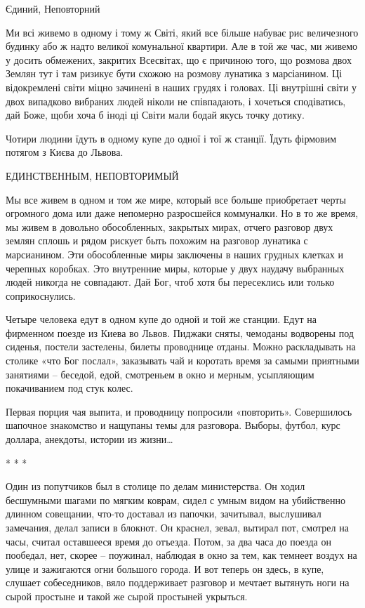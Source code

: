  
 
 
 
 

Єдиний, Неповторний

Ми всі живемо в одному і тому ж Світі, який все більше набуває рис величезного
будинку або ж надто великої комунальної квартири.  Але в той же час, ми живемо
у досить обмежених, закритих Всесвітах, що є причиною того, що розмова двох
Землян тут і там ризикує бути схожою на розмову лунатика з марсіанином. Ці
відокремлені світи міцно зачинені в наших грудях і головах. Ці внутрішні світи
у двох випадково вибраних людей ніколи не співпадають, і хочеться сподіватись,
дай Боже, щоби хоча б іноді ці Світи мали бодай якусь точку дотику.

Чотири людини їдуть в одному купе до одної і тої ж станції. Їдуть фірмовим потягом з Києва до Львова. 

ЕДИНСТВЕННЫМ, НЕПОВТОРИМЫЙ

Мы все живем в одном и том же мире, который все больше приобретает черты огромного дома или даже непомерно разросшейся коммуналки. Но в то же время, мы живем в довольно обособленных, закрытых мирах, отчего разговор двух землян сплошь и рядом рискует быть похожим на разговор лунатика с марсианином. Эти обособленные миры заключены в наших грудных клетках и черепных коробках. Это внутренние миры, которые у двух наудачу выбранных людей никогда не совпадают. Дай Бог, чтоб хотя бы пересеклись или только соприкоснулись.

Четыре человека едут в одном купе до одной и той же станции. Едут на фирменном поезде из Киева во Львов. Пиджаки сняты, чемоданы водворены под сиденья, постели застелены, билеты проводнице отданы. Можно раскладывать на столике «что Бог послал», заказывать чай и коротать время за самыми приятными занятиями – беседой, едой, смотреньем в окно и мерным, усыпляющим покачиванием под стук колес.

Первая порция чая выпита, и проводницу попросили «повторить». Совершилось шапочное знакомство и нащупаны темы для разговора. Выборы, футбол, курс доллара, анекдоты, истории из жизни…

* * *

Один из попутчиков был в столице по делам министерства. Он ходил бесшумными шагами по мягким коврам, сидел с умным видом на убийственно длинном совещании, что-то доставал из папочки, зачитывал, выслушивал замечания, делал записи в блокнот. Он краснел, зевал, вытирал пот, смотрел на часы, считал оставшееся время до отъезда. Потом, за два часа до поезда он пообедал, нет, скорее – поужинал, наблюдая в окно за тем, как темнеет воздух на улице и зажигаются огни большого города. И вот теперь он здесь, в купе, слушает собеседников, вяло поддерживает разговор и мечтает вытянуть ноги на сырой простыне и такой же сырой простыней укрыться.


